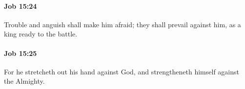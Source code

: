		\paragraph{Job 15:24} %
			\label{JOB-15-24}

			Trouble and anguish shall make him afraid; they shall prevail against him, as a king ready to the battle.


		\paragraph{Job 15:25} %
			\label{JOB-15-25}

			For he stretcheth out his hand against God, and strengtheneth himself against the Almighty.


